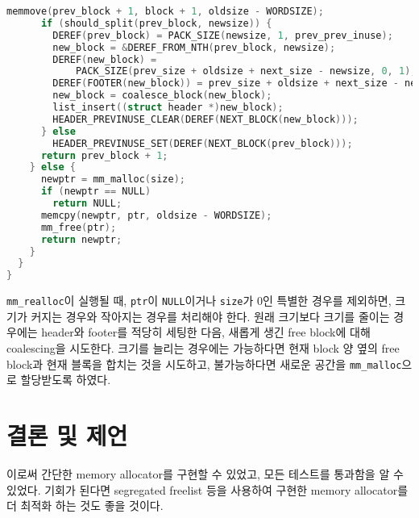 \documentclass{scrartcl}
\begin{document}
\begin{lstlisting}[language=C]
      memmove(prev_block + 1, block + 1, oldsize - WORDSIZE);
      if (should_split(prev_block, newsize)) {
        DEREF(prev_block) = PACK_SIZE(newsize, 1, prev_prev_inuse);
        new_block = &DEREF_FROM_NTH(prev_block, newsize);
        DEREF(new_block) =
            PACK_SIZE(prev_size + oldsize + next_size - newsize, 0, 1);
        DEREF(FOOTER(new_block)) = prev_size + oldsize + next_size - newsize;
        new_block = coalesce_block(new_block);
        list_insert((struct header *)new_block);
        HEADER_PREVINUSE_CLEAR(DEREF(NEXT_BLOCK(new_block)));
      } else
        HEADER_PREVINUSE_SET(DEREF(NEXT_BLOCK(prev_block)));
      return prev_block + 1;
    } else {
      newptr = mm_malloc(size);
      if (newptr == NULL)
        return NULL;
      memcpy(newptr, ptr, oldsize - WORDSIZE);
      mm_free(ptr);
      return newptr;
    }
  }
}
\end{lstlisting}
\texttt{mm\_realloc}이 실행될 때, \texttt{ptr}이 \texttt{NULL}이거나
\texttt{size}가 0인 특별한 경우를 제외하면, 크기가 커지는 경우와 작아지는
경우를 처리해야 한다. 원래 크기보다 크기를 줄이는 경우에는 header와 footer를
적당히 세팅한 다음, 새롭게 생긴 free block에 대해 coalescing을 시도한다. 크기를
늘리는 경우에는 가능하다면 현재 block 양 옆의 free block과 현재 블록을 합치는
것을 시도하고, 불가능하다면 새로운 공간을 \texttt{mm\_malloc}으로 할당받도록
하였다.

\section{결론 및 제언}
이로써 간단한 memory allocator를 구현할 수 있었고, 모든 테스트를 통과함을 알 수
있었다. 기회가 된다면 segregated freelist 등을 사용하여 구현한 memory
allocator를 더 최적화 하는 것도 좋을 것이다.
\end{document}
